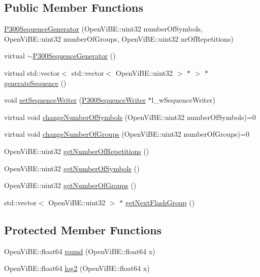 \subsection*{Public Member Functions}
\begin{DoxyCompactItemize}
\item 
\hyperlink{classOpenViBEApplications_1_1P300SequenceGenerator_a08d681a56d0d687515ef58c12d5fe88e}{P300SequenceGenerator} (OpenViBE::uint32 numberOfSymbols, OpenViBE::uint32 numberOfGroups, OpenViBE::uint32 nrOfRepetitions)
\item 
virtual \hyperlink{classOpenViBEApplications_1_1P300SequenceGenerator_ad1df59d4ed25b3ebd0389adc949cbd65}{$\sim$P300SequenceGenerator} ()
\item 
virtual std::vector$<$ std::vector$<$ OpenViBE::uint32 $>$ $\ast$ $>$ $\ast$ \hyperlink{classOpenViBEApplications_1_1P300SequenceGenerator_a29143168551c2355d07befd1fe13e1b2}{generateSequence} ()
\item 
void \hyperlink{classOpenViBEApplications_1_1P300SequenceGenerator_a7e57f5de7708f11a3a5986f96d694c15}{setSequenceWriter} (\hyperlink{classOpenViBEApplications_1_1P300SequenceWriter}{P300SequenceWriter} $\ast$l\_\-wSequenceWriter)
\item 
virtual void \hyperlink{classOpenViBEApplications_1_1P300SequenceGenerator_a657340d199fda2516bc7e35f32f9f630}{changeNumberOfSymbols} (OpenViBE::uint32 numberOfSymbols)=0
\item 
virtual void \hyperlink{classOpenViBEApplications_1_1P300SequenceGenerator_adc636f0a0d1dee0a0b429ef91f1fa57f}{changeNumberOfGroups} (OpenViBE::uint32 numberOfGroups)=0
\item 
OpenViBE::uint32 \hyperlink{classOpenViBEApplications_1_1P300SequenceGenerator_ae2b26947433e2a16c4007da82781458f}{getNumberOfRepetitions} ()
\item 
OpenViBE::uint32 \hyperlink{classOpenViBEApplications_1_1P300SequenceGenerator_aa89e135d54fbfc81fbbcc195a74191eb}{getNumberOfSymbols} ()
\item 
OpenViBE::uint32 \hyperlink{classOpenViBEApplications_1_1P300SequenceGenerator_a7cfdd3b3a28a38e81ec94cffc0b5ca3a}{getNumberOfGroups} ()
\item 
std::vector$<$ OpenViBE::uint32 $>$ $\ast$ \hyperlink{classOpenViBEApplications_1_1P300SequenceGenerator_a658f72d73104923ab74ed102283d5419}{getNextFlashGroup} ()
\end{DoxyCompactItemize}
\subsection*{Protected Member Functions}
\begin{DoxyCompactItemize}
\item 
OpenViBE::float64 \hyperlink{classOpenViBEApplications_1_1P300SequenceGenerator_a2d44c436cc1f61e6e6dffad60ea0a420}{round} (OpenViBE::float64 x)
\item 
OpenViBE::float64 \hyperlink{classOpenViBEApplications_1_1P300SequenceGenerator_a496c6ce0f9c388fa8b4c24999c0df38e}{log2} (OpenViBE::float64 x)
\end{DoxyCompactItemize}
